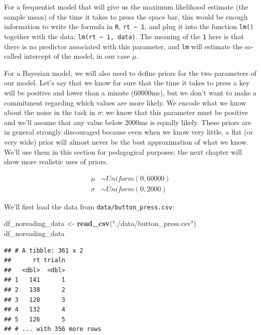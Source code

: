 \documentclass[12pt,]{krantz}
\newenvironment{Shaded}{\begin{snugshade}}{\end{snugshade}}
\newcommand{\KeywordTok}[1]{\textcolor[rgb]{0.13,0.29,0.53}{\textbf{#1}}}
\newcommand{\NormalTok}[1]{#1}
\newcommand{\StringTok}[1]{\textcolor[rgb]{0.31,0.60,0.02}{#1}}
\theoremstyle{definition}
\theoremstyle{definition}
\theoremstyle{definition}
\theoremstyle{remark}
\begin{document}
For a frequentist model that will give us the maximum likelihood estimate (the sample mean) of the time it takes to press the space bar, this would be enough information to write the formula in \texttt{R}, \texttt{rt\ \textasciitilde{}\ 1}, and plug it into the function \texttt{lm()} together with the data: \texttt{lm(rt\ \textasciitilde{}\ 1,\ data)}. The meaning of the \texttt{1} here is that there is no predictor associated with this parameter, and \texttt{lm} will estimate the so-called intercept of the model, in our case \(\mu\).

For a Bayesian model, we will also need to define priors for the two parameters of our model. Let's say that we know for sure that the time it takes to press a key will be positive and lower than a minute (60000ms), but we don't want to make a commitment regarding which values are more likely. We encode what we know about the noise in the task in \(\sigma\): we know that this parameter must be positive and we'll assume that any value below 2000ms is equally likely. These priors are in general strongly discouraged because even when we know very little, a flat (or very wide) prior will almost never be the best approximation of what we know. We'll use them in this section for pedagogical purposes; the next chapter will show more realistic uses of priors.

\begin{equation}
\begin{aligned}
\mu &\sim Uniform(0, 60000) \\
\sigma &\sim Uniform(0, 2000) 
\end{aligned}
\label{eq:rtpriors}
\end{equation}

We'll first load the data from \texttt{data/button\_press.csv}:

\begin{Shaded}
\begin{Highlighting}[]
\NormalTok{df_noreading_data <-}\StringTok{ }\KeywordTok{read_csv}\NormalTok{(}\StringTok{"./data/button_press.csv"}\NormalTok{)}
\NormalTok{df_noreading_data}
\end{Highlighting}
\end{Shaded}

\begin{verbatim}
## # A tibble: 361 x 2
##      rt trialn
##   <dbl>  <dbl>
## 1   141      1
## 2   138      2
## 3   128      3
## 4   132      4
## 5   126      5
## # ... with 356 more rows
\end{verbatim}
\end{document}
